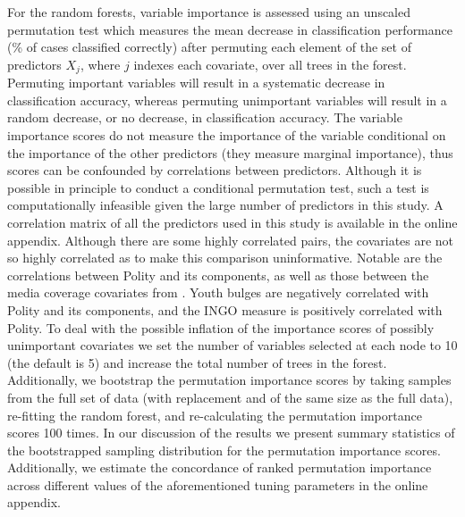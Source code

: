 \documentclass[11pt]{article}
\begin{document}
For the random forests, variable importance is assessed using an unscaled permutation test which measures the mean decrease in classification performance (\% of cases classified correctly) after permuting each element of the set of predictors $X_j$, where $j$ indexes each covariate, over all trees in the forest. Permuting important variables will result in a systematic decrease in classification accuracy, whereas permuting unimportant variables will result in a random decrease, or no decrease, in classification accuracy. The variable importance scores do not measure the importance of the variable conditional on the importance of the other predictors (they measure marginal importance), thus scores can be confounded by correlations between predictors. Although it is possible in principle to conduct a conditional permutation test, such a test is computationally infeasible given the large number of predictors in this study. A correlation matrix of all the predictors used in this study is available in the online appendix. Although there are some highly correlated pairs, the covariates are not so highly correlated as to make this comparison uninformative. Notable are the correlations between Polity and its components, as well as those between the media coverage covariates from \citet{RonRamosRodgers2005}. Youth bulges are negatively correlated with Polity and its components, and the INGO measure is positively correlated with Polity. To deal with the possible inflation of the importance scores of possibly unimportant covariates we set the number of variables selected at each node to 10 (the default is 5) and increase the total number of trees in the forest. Additionally, we bootstrap the permutation importance scores by taking samples from the full set of data (with replacement and of the same size as the full data), re-fitting the random forest, and re-calculating the permutation importance scores 100 times. In our discussion of the results we present summary statistics of the bootstrapped sampling distribution for the permutation importance scores. Additionally, we estimate the concordance of ranked permutation importance across different values of the aforementioned tuning parameters in the online appendix.
\end{document}
